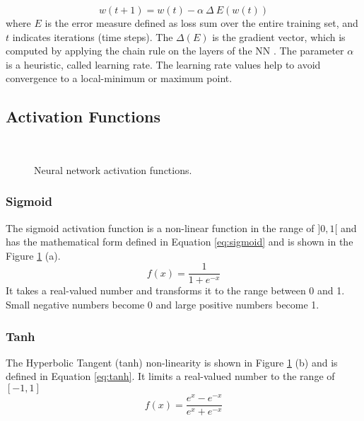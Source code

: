 \begin{equation}
w(t+1) = w(t) - \alpha\ \Delta\ E(w(t))
\label{eq:bp}
\end{equation}
where $E$ is the error measure defined as loss sum over the entire training set, and $t$ indicates iterations (time steps). The $\Delta(E)$ is the gradient vector, which is computed by applying the chain rule on the layers of the NN \cite{rumelhart1985learning}. The parameter $\alpha$ is a heuristic, called learning rate. The learning rate values help to avoid convergence to a local-minimum or maximum point. 

\subsection{Activation Functions}
\begin{figure}[!htb]
\centering
\hspace*{0.2in} %
\\
\hspace*{0.2in} %


\caption{Neural network activation functions. } \label{fig:activation}
\end{figure}
\subsubsection{Sigmoid}
The sigmoid activation function is a non-linear function in the range of $]0, 1[$ and has the mathematical form defined in Equation \ref{eq:sigmoid} and is shown in the Figure \ref{fig:activation} (a).
\begin{equation}
f(x) = \frac{1}{1+e^{-x}}
\label{eq:sigmoid}
\end{equation}
It takes a real-valued number and transforms it to the range between 0 and 1. Small negative numbers become 0 and large positive numbers become 1. 
\subsubsection{Tanh}

The Hyperbolic Tangent (tanh) non-linearity is shown in Figure \ref{fig:activation} (b) and is defined in Equation \ref{eq:tanh}. It limits a real-valued number to the range of $[-1, 1]$
\begin{equation}
f(x) = \frac{e^x - e^{-x}}{e^x + e^{-x}}
\label{eq:tanh}
\end{equation}

